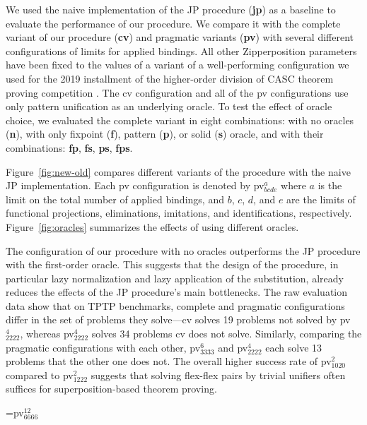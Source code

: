 We used the naive implementation of the JP procedure (\textbf{jp}) as a baseline
to evaluate the performance of our procedure. We compare it with the complete
variant of our procedure (\textbf{cv}) and pragmatic variants (\textbf{pv}) with
several different configurations of limits for applied bindings. All other
Zipperposition parameters have been fixed to the values of a variant of a
well-performing configuration we used for the 2019 installment of the higher-order
division of CASC theorem proving competition \cite{gs-19-casc27}. The cv
configuration and all of the pv configurations use only pattern unification as
an underlying oracle. To test the effect of oracle choice, we evaluated the
complete variant in eight combinations: with no oracles (\textbf{n}), with only
fixpoint (\textbf{f}), pattern (\textbf{p}), or solid (\textbf{s}) oracle, and
with their combinations: \textbf{fp}, \textbf{fs}, \textbf{ps}, \textbf{fps}.

Figure~\ref{fig:new-old} compares different variants of the procedure with the
naive JP implementation. Each pv configuration is denoted by pv$^{a}_{bcde}$
where $a$ is the limit on the total number of applied bindings, and $b$, $c$,
$d$, and $e$ are the limits of functional projections, eliminations, imitations,
and identifications, respectively. Figure~\ref{fig:oracles} summarizes the
effects of using different oracles.

The configuration of our procedure with no oracles outperforms the JP procedure with the first-order oracle. This
suggests that the design of the procedure, in particular lazy normalization and
lazy application of the substitution, already reduces the effects of the JP
procedure's main bottlenecks. The raw evaluation data show that on TPTP benchmarks, complete and pragmatic configurations
differ in the set of problems they solve---cv solves 19
problems not solved by pv$^{4}_{2222}$, whereas pv$^{4}_{2222}$ solves 34
problems cv does not solve. Similarly, comparing the pragmatic configurations with each other,
pv$^{6}_{3333}$ and pv$^{4}_{2222}$ each solve 13 problems that the other one does not.  The overall higher success rate of pv$^2_{1020}$ compared to
pv$^2_{1222}$ suggests that solving flex-flex pairs by trivial unifiers often
suffices for superposition-based theorem proving. 

\newbox\mybox
\setbox\mybox=\hbox{\small pv$^{12}_{6666}$}

\newcommand\HEAD[1]{\hbox to \wd\mybox{\hfill\hbox{#1}\hfill}}
\newcommand\Z{\phantom{0}}
\newcommand\MIDLINE{\\[.25ex]\hline\rule{0pt}{3ex}}

